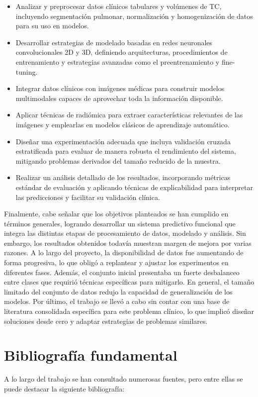 \begin{itemize}
    \item Analizar y preprocesar datos clínicos tabulares y volúmenes de TC, incluyendo segmentación pulmonar, normalización y homogenización de datos para su uso en modelos.
    \item Desarrollar estrategias de modelado basadas en redes neuronales convolucionales 2D y 3D, definiendo arquitecturas, procedimientos de entrenamiento y estrategias avanzadas como el preentrenamiento y fine-tuning.
    \item Integrar datos clínicos con imágenes médicas para construir modelos multimodales capaces de aprovechar toda la información disponible.
    \item Aplicar técnicas de radiómica para extraer características relevantes de las imágenes y emplearlas en modelos clásicos de aprendizaje automático.
    \item Diseñar una experimentación adecuada que incluya validación cruzada estratificada para evaluar de manera robusta el rendimiento del sistema, mitigando problemas derivados del tamaño reducido de la muestra.
    \item Realizar un análisis detallado de los resultados, incorporando métricas estándar de evaluación y aplicando técnicas de explicabilidad para interpretar las predicciones y facilitar su validación clínica.
\end{itemize}


Finalmente, cabe señalar que los objetivos planteados se han cumplido en términos generales, logrando desarrollar un sistema predictivo funcional que integra las distintas etapas de procesamiento de datos, modelado y análisis. Sin embargo, los resultados obtenidos todavía muestran margen de mejora por varias razones. A lo largo del proyecto, la disponibilidad de datos fue aumentando de forma progresiva, lo que obligó a replantear y ajustar los experimentos en diferentes fases. Además, el conjunto inicial presentaba un fuerte desbalanceo entre clases que requirió técnicas específicas para mitigarlo. En general, el tamaño limitado del conjunto de datos redujo la capacidad de generalización de los modelos. Por último, el trabajo se llevó a cabo sin contar con una base de literatura consolidada específica para este problema clínico, lo que implicó diseñar soluciones desde cero y adaptar estrategias de problemas similares.



\section{Bibliografía fundamental}
A lo largo del trabajo se han consultado numerosas fuentes, pero entre ellas se puede destacar la siguiente bibliografía:

